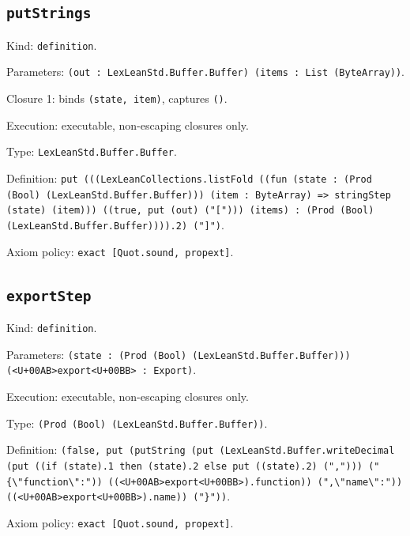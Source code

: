 \documentclass[11pt]{article}
\begin{document}
\subsection*{\texttt{putStrings}}
\noindent Kind: \texttt{definition}.\par
\noindent Parameters: \texttt{(out : LexLeanStd.Buffer.Buffer) (items : List (ByteArray))}.\par
\noindent Closure 1: binds \texttt{(state, item)}, captures \texttt{()}.\par
\noindent Execution: executable, non-escaping closures only.\par
\noindent Type: \texttt{LexLeanStd.Buffer.Buffer}.\par
\noindent Definition: \texttt{put (((LexLeanCollections.listFold ((fun (state : (Prod (Bool) (LexLeanStd.Buffer.Buffer))) (item : ByteArray) => stringStep (state) (item))) ((true, put (out) ("["))) (items) : (Prod (Bool) (LexLeanStd.Buffer.Buffer)))).2) ("]")}.\par
\noindent Axiom policy: \texttt{exact [Quot.sound, propext]}.\par
\subsection*{\texttt{exportStep}}
\noindent Kind: \texttt{definition}.\par
\noindent Parameters: \texttt{(state : (Prod (Bool) (LexLeanStd.Buffer.Buffer))) (<U+00AB>export<U+00BB> : Export)}.\par
\noindent Execution: executable, non-escaping closures only.\par
\noindent Type: \texttt{(Prod (Bool) (LexLeanStd.Buffer.Buffer))}.\par
\noindent Definition: \texttt{(false, put (putString (put (LexLeanStd.Buffer.writeDecimal (put ((if (state).1 then (state).2 else put ((state).2) (","))) ("\{\textbackslash{}"function\textbackslash{}":")) ((<U+00AB>export<U+00BB>).function)) (",\textbackslash{}"name\textbackslash{}":")) ((<U+00AB>export<U+00BB>).name)) ("\}"))}.\par
\noindent Axiom policy: \texttt{exact [Quot.sound, propext]}.\par
\end{document}
